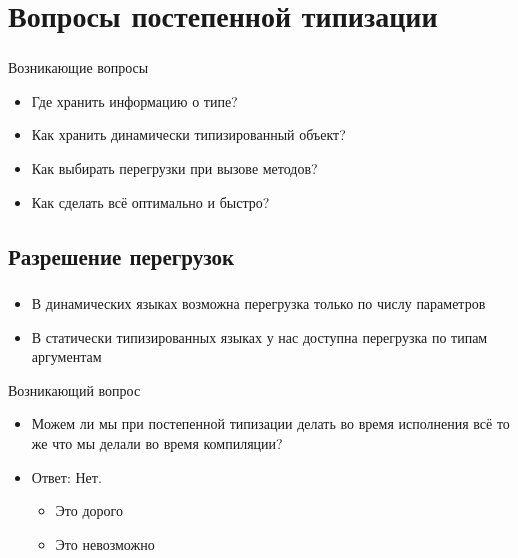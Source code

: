 \documentclass[t]{beamer}  %
\begin{document}
\section{Вопросы постепенной типизации}
\begin{frame}
	\frametitle{\insertsection} 
    \begin{block}{Возникающие вопросы}
		\begin{itemize}
          \item Где хранить информацию о типе?
          \item Как хранить динамически типизированный объект?
          \item Как выбирать перегрузки при вызове методов?
          \item Как сделать всё оптимально и быстро?
		\end{itemize}
	\end{block}
\end{frame}

\subsection{Разрешение перегрузок}
\begin{frame}
	\frametitle{\insertsection} 
  	\framesubtitle{\insertsubsection}
	\begin{itemize}
       \item В динамических языках возможна перегрузка только по числу параметров
       \item В статически типизированных языках у нас доступна перегрузка по типам аргументам
    \end{itemize}
    \begin{block}{Возникающий вопрос}
		\begin{itemize}
          \item Можем ли мы при постепенной типизации делать во время исполнения всё то же что мы делали во время компиляции?
          \item<2> Ответ: Нет.
          		\begin{itemize}
                	\item Это дорого
                    \item Это невозможно
                \end{itemize}
		\end{itemize}
	\end{block}
\end{frame}
\end{document}
